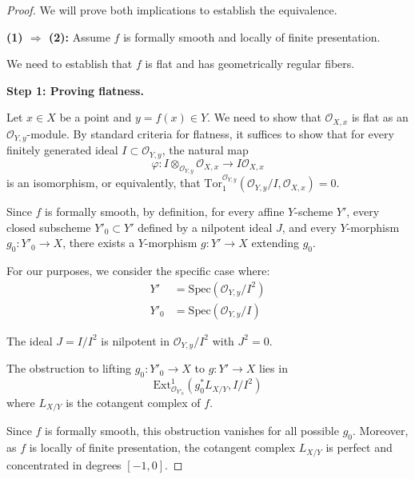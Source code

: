 \documentclass[12pt]{article}
\begin{document}
\begin{proof}
    We will prove both implications to establish the equivalence.

    \medskip
    \noindent \textbf{(1) $\Rightarrow$ (2):} Assume $f$ is formally smooth and locally of finite presentation.

    \medskip
    \noindent We need to establish that $f$ is flat and has geometrically regular fibers.

    \medskip
    \noindent \textbf{Step 1: Proving flatness.}

    \medskip
    \noindent Let $x \in X$ be a point and $y = f(x) \in Y$. We need to show that $\mathcal{O}_{X,x}$ is flat as an $\mathcal{O}_{Y,y}$-module. By standard criteria for flatness, it suffices to show that for every finitely generated ideal $I \subset \mathcal{O}_{Y,y}$, the natural map
    \begin{equation}
        \varphi: I \otimes_{\mathcal{O}_{Y,y}} \mathcal{O}_{X,x} \to I\mathcal{O}_{X,x}
    \end{equation}
    is an isomorphism, or equivalently, that $\text{Tor}_1^{\mathcal{O}_{Y,y}}(\mathcal{O}_{Y,y}/I, \mathcal{O}_{X,x}) = 0$.

    \medskip
    \noindent Since $f$ is formally smooth, by definition, for every affine $Y$-scheme $Y'$, every closed subscheme $Y'_0 \subset Y'$ defined by a nilpotent ideal $J$, and every $Y$-morphism $g_0: Y'_0 \to X$, there exists a $Y$-morphism $g: Y' \to X$ extending $g_0$.

    \medskip
    \noindent For our purposes, we consider the specific case where:
    \begin{align}
        Y'   & = \text{Spec}(\mathcal{O}_{Y,y}/I^2) \\
        Y'_0 & = \text{Spec}(\mathcal{O}_{Y,y}/I)
    \end{align}

    \noindent The ideal $J = I/I^2$ is nilpotent in $\mathcal{O}_{Y,y}/I^2$ with $J^2 = 0$.

    \medskip
    \noindent The obstruction to lifting $g_0: Y'_0 \to X$ to $g: Y' \to X$ lies in
    \begin{equation}
        \text{Ext}^1_{\mathcal{O}_{Y'_0}}(g_0^*L_{X/Y}, I/I^2)
    \end{equation}
    where $L_{X/Y}$ is the cotangent complex of $f$.

    \medskip
    \noindent Since $f$ is formally smooth, this obstruction vanishes for all possible $g_0$. Moreover, as $f$ is locally of finite presentation, the cotangent complex $L_{X/Y}$ is perfect and concentrated in degrees $[-1,0]$.


\end{proof}
\end{document}

